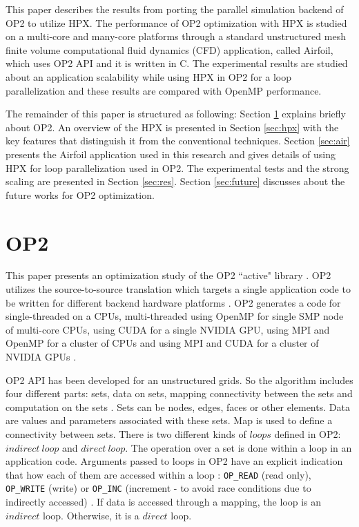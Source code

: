 \documentclass[conference]{IEEEtran}
\begin{document}
This paper describes the results from porting the parallel simulation backend of OP2 to utilize HPX. The performance of OP2 optimization with HPX is studied on a multi-core and many-core platforms through a standard unstructured mesh finite volume computational fluid dynamics (CFD) application, called Airfoil, which uses OP2 API and it is written in C. The experimental results are studied about an application scalability while using HPX in OP2 for a loop parallelization and these results are compared with OpenMP performance.

The remainder of this paper is structured as following: Section \ref{sec:op2} explains briefly about OP2. An overview of the HPX is presented in Section \ref{sec:hpx} with the key features that distinguish it from the conventional techniques. Section \ref{sec:air} presents the Airfoil application used in this research and gives details of using HPX for loop parallelization used in OP2. The experimental tests and the strong scaling are presented in Section \ref{sec:res}. Section \ref{sec:future} discusses about the future works for OP2 optimization.

\section{OP2}
\label{sec:op2}

This paper presents an optimization study of the OP2 ``active" library \cite{o1}. OP2 utilizes the source-to-source translation which targets a single application code to be written for different backend hardware platforms \cite{o2,o3,o4}. OP2 generates a code for single-threaded on a CPUs, multi-threaded using OpenMP for single SMP node of multi-core CPUs, using CUDA for a single NVIDIA GPU, using MPI and OpenMP for a cluster of CPUs and using MPI and CUDA for a cluster of NVIDIA GPUs \cite{o4}. 

OP2 API has been developed for an unstructured grids. So the algorithm includes four different parts: sets, data on sets, mapping connectivity between the sets and computation on the sets \cite{o2,o7}. Sets can be nodes, edges, faces or other elements. Data are values and parameters associated with these sets. Map is used to define a connectivity between sets. There is two different kinds of $loops$ defined in OP2: $indirect~loop$ and $direct~loop$. The operation over a set is done within a loop in an application code. Arguments passed to loops in OP2 have an explicit indication that how each of them are accessed within a loop : \texttt{OP\_READ} (read only), \texttt{OP\_WRITE} (write) or \texttt{OP\_INC} (increment - to avoid race conditions due to indirectly accessed) \cite{o1}. If data is accessed through a mapping, the loop is an $indirect$ loop. Otherwise, it is a $direct$ loop. 
\end{document}
